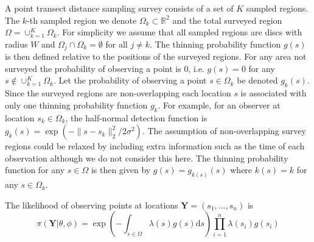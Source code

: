 \documentclass[preprint,12pt]{elsarticle}
\newcommand{\bm}{\boldsymbol}  %
\begin{document}
A point transect distance sampling survey consists of a set of $K$ sampled regions.  The $k$-th sampled region we denote $\Omega_k \subset \mathbb{R}^2$ and the total surveyed region $\Omega = \cup_{k=1}^K \Omega_k$.  For simplicity we assume that all sampled regions are discs with radius $W$ and $\Omega_j \cap \Omega_k = \emptyset$ for all $j \neq k$.  The thinning probability function $g(s)$ is then defined relative to the positions of the surveyed regions.  For any area not surveyed the probability of observing a point is $0$, i.e. $g(s) = 0$ for any $s \notin \cup_{k=1}^K \Omega_k$.  Let the probability of observing a point $s \in \Omega_k$ be denoted $g_k(s)$.  Since the surveyed regions are non-overlapping each location $s$ is associated with only one thinning probability function $g_k$.  For example, for an observer at location $s_k \in \Omega_k$, the half-normal detection function is $g_k(s) = \exp(-\lVert s - s_k \rVert_2^2 / 2\sigma^2)$. The assumption of non-overlapping survey regions could be relaxed by including extra information such as the time of each observation although we do not consider this here.  The thinning probability function for any $s \in \Omega$ is then given by $g(s) = g_{k(s)}(s)$ where $k(s) = k$ for any $s \in \Omega_k$.  

The likelihood of observing points at locations $\bm{Y} = (s_1, \ldots, s_n)$ is
\begin{equation}
\pi(\bm{Y} | \theta, \phi) = \exp\left(-\int_{s \in \Omega} \lambda(s) g(s) \mathrm{d}s \right)\prod_{i=1}^n \lambda(s_i)g(s_i)
\end{equation}
\end{document}
